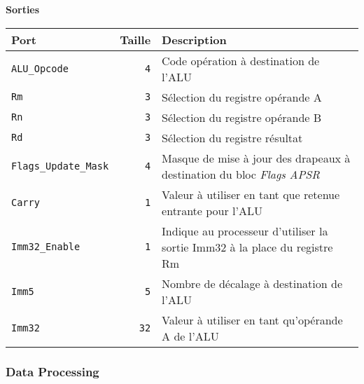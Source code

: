 \documentclass{article}
\begin{document}
    \vspace{1em}
    \textbf{Sorties}\\

    \begin{tabular}{|l|r|l|}
        \hline
        \textbf{Port}                & \textbf{Taille} & \textbf{Description}                                                         \\
        \hline

        \texttt{ALU\_Opcode}         & \texttt{4}      & Code opération à destination de l'ALU                                        \\
        \hline
        \texttt{Rm}                  & \texttt{3}      & Sélection du registre opérande A                                             \\
        \hline
        \texttt{Rn}                  & \texttt{3}      & Sélection du registre opérande B                                             \\
        \hline
        \texttt{Rd}                  & \texttt{3}      & Sélection du registre résultat                                               \\
        \hline
        \texttt{Flags\_Update\_Mask} & \texttt{4}      & Masque de mise à jour des drapeaux à destination du bloc \textit{Flags APSR} \\
        \hline
        \texttt{Carry}               & \texttt{1}      & Valeur à utiliser en tant que retenue entrante pour l'ALU                    \\
        \hline
        \texttt{Imm32\_Enable}       & \texttt{1}      & Indique au processeur d'utiliser la sortie Imm32 à la place du registre Rm   \\
        \hline
        \texttt{Imm5}                & \texttt{5}      & Nombre de décalage à destination de l'ALU                                    \\
        \hline
        \texttt{Imm32}               & \texttt{32}     & Valeur à utiliser en tant qu'opérande A de l'ALU                             \\

        \hline
    \end{tabular}

    \subsubsection{Data Processing}
    \label{sec:DataProc}
\end{document}
